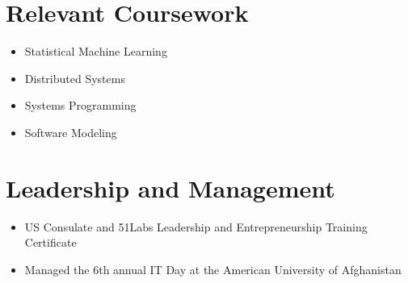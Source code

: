 \documentclass[a4paper,10pt]{article}
\begin{document}
\section{Relevant Coursework}
\begin{multicols}{2}
    \begin{itemize}
        \item Statistical Machine Learning
        \item Distributed Systems
        \item Systems Programming
        \item Software Modeling
    \end{itemize}
\end{multicols}

\section{Leadership and Management}
\begin{itemize}
    \item US Consulate and 51Labs Leadership and Entrepreneurship Training Certificate
    \item Managed the 6th annual IT Day at the American University of Afghanistan
\end{itemize}
\end{document}
